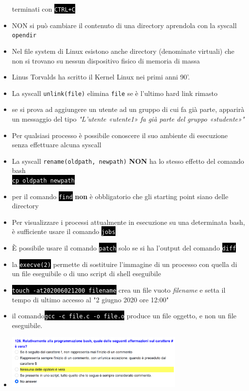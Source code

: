 \documentclass[12pt, letterpaper]{article}
\newcommand{\code}[1]{\colorbox{light-gray}{\texttt{#1}}}
\newcommand{\shelll}[1]{\colorbox{black}{\textcolor{white}{\texttt{#1}}}}
\begin{document}
\begin{itemize}
    terminati con \shelll{CTRL+C}
    \item NON si può cambiare il contenuto di una directory aprendola con la syscall \code{opendir}
    \item Nel file system di Linux esistono anche directory (denominate virtuali) che non si trovano su nessun dispositivo fisico di memoria di massa
    \item Linus Torvalds ha scritto il Kernel Linux nei primi anni 90'.
    \item La syscall \code{unlink(file)} elimina \code{file} se è l'ultimo hard link rimasto
    \item se  si prova ad aggiungere un utente ad un gruppo di cui fa già parte, apparirà un messaggio 
    del tipo \textit{"L'utente «utente1» fa già parte del gruppo «studente»"}
    \item Per qualsiasi processo è possibile conoscere il suo ambiente di esecuzione senza effettuare alcuna syscall
    \item La syscall \code{rename(oldpath, newpath)} \textbf{NON} ha lo stesso effetto del comando bash \\\shelll{cp oldpath newpath}
    \item per il comando \shelll{find} \textbf{non} è obbligatorio che gli starting point siano delle directory
    \item Per visualizzare i processi attualmente in esecuzione su una determinata bash, è sufficiente usare il comando \shelll{jobs}
    \item È possibile usare il comando  \shelll{patch} solo se si ha l'output del comando  \shelll{diff}
    \item la \shelll{execve(2)} permette di sostituire l'immagine di un processo con quella di un file eseguibile o di uno script di shell eseguibile
    \item \shelll{touch -at202006021200  filename} crea un file vuoto \textit{filename} e setta il tempo 
    di ultimo accesso al "2 giugno 2020 ore 12:00"
    \item il comando\shelll{gcc -c file.c -o file.o}  produce un file oggetto, e non un file eseguibile.
    \item \begin{center}
        \includegraphics[width=0.7\textwidth ]{images/domandabash.png}

\end{center}
\end{itemize}
\end{document}
